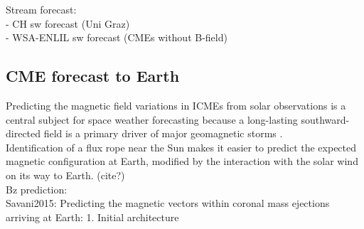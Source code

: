 Stream forecast:\\
- CH sw forecast (Uni Graz)\\
- WSA-ENLIL sw forecast (CMEs without B-field)\\





%
%
%





\subsection{CME forecast to Earth}

Predicting the magnetic field variations in ICMEs from solar observations is a central subject for space weather forecasting because a long-lasting southward-directed field is a primary driver of major geomagnetic storms \citep{Zhang2007}.\\

Identification of a flux rope near the Sun makes it easier to predict the expected magnetic configuration at Earth, modified by the interaction with the solar wind on its way to Earth. (cite?)\\

Bz prediction:\\
Savani2015: Predicting the magnetic vectors within coronal mass ejections arriving at Earth: 1. Initial architecture\\

